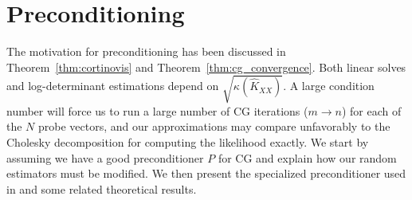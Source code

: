 \documentclass{article}
\begin{document}

\section{Preconditioning} \label{sec:precond}

The motivation for preconditioning has been discussed in Theorem~\ref{thm:cortinovis} and Theorem~\ref{thm:cg_convergence}. Both linear solves and log-determinant estimations depend on $\sqrt{\kappa(\widehat K_{XX})}$. A large condition number will force us to run a large number of CG iterations ($m \to n$) for each of the $N$ probe vectors, and our approximations may compare unfavorably to the Cholesky decomposition for computing the likelihood exactly. 
We start by assuming we have a good preconditioner $P$ for CG and explain how our random estimators must be modified. We then present the specialized preconditioner used in \cite{gardner_gpytorch_2021} and some related theoretical results.
\end{document}
